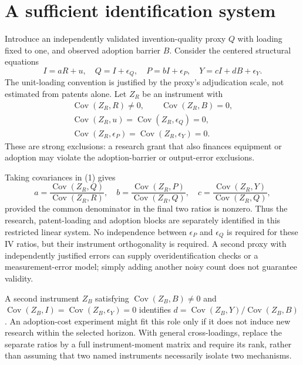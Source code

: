 \documentclass[11pt]{article}
\begin{document}
\section*{A sufficient identification system}
Introduce an independently validated invention-quality proxy $Q$ with loading fixed to one, and observed adoption barrier $B$. Consider the centered structural equations
\[
 I=aR+u,\quad Q=I+\epsilon_Q,\quad P=bI+\epsilon_P,
 \quad Y=cI+dB+\epsilon_Y.                            \tag{1}
\]
The unit-loading convention is justified by the proxy's adjudication scale, not estimated from patents alone. Let $Z_R$ be an instrument with
\[
 \begin{gathered}
 \operatorname{Cov}(Z_R,R)\ne0,\qquad \operatorname{Cov}(Z_R,B)=0,\\
 \operatorname{Cov}(Z_R,u)=\operatorname{Cov}(Z_R,\epsilon_Q)=0,\\
 \operatorname{Cov}(Z_R,\epsilon_P)=\operatorname{Cov}(Z_R,\epsilon_Y)=0.
 \end{gathered}
\]
These are strong exclusions: a research grant that also finances equipment or adoption may violate the adoption-barrier or output-error exclusions.

Taking covariances in (1) gives
\[
 a=\frac{\operatorname{Cov}(Z_R,Q)}{\operatorname{Cov}(Z_R,R)},
 \quad b=\frac{\operatorname{Cov}(Z_R,P)}{\operatorname{Cov}(Z_R,Q)},
 \quad c=\frac{\operatorname{Cov}(Z_R,Y)}{\operatorname{Cov}(Z_R,Q)}, \tag{2}
\]
provided the common denominator in the final two ratios is nonzero. Thus the research, patent-loading and adoption blocks are separately identified in this restricted linear system. No independence between $\epsilon_P$ and $\epsilon_Q$ is required for these IV ratios, but their instrument orthogonality is required. A second proxy with independently justified errors can supply overidentification checks or a measurement-error model; simply adding another noisy count does not guarantee validity.

A second instrument $Z_B$ satisfying
$\operatorname{Cov}(Z_B,B)\ne0$ and
$\operatorname{Cov}(Z_B,I)=\operatorname{Cov}(Z_B,\epsilon_Y)=0$
identifies $d=\operatorname{Cov}(Z_B,Y)/\operatorname{Cov}(Z_B,B)$.
An adoption-cost experiment might fit this role only if it does not induce new research within the selected horizon. With general cross-loadings, replace the separate ratios by a full instrument-moment matrix and require its rank, rather than assuming that two named instruments necessarily isolate two mechanisms.
\end{document}
